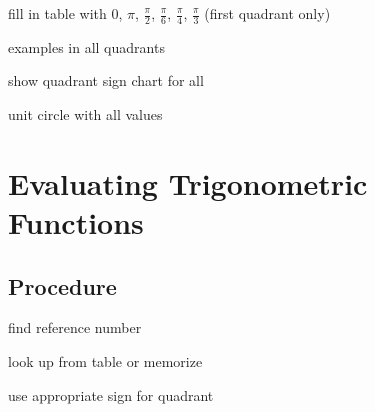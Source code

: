 \documentclass{exam}
\begin{document}
  \begin{itemize*}
    \item fill in table with 0, $\pi$, $\frac{\pi}{2}$, $\frac{\pi}{6}$, $\frac{\pi}{4}$, $\frac{\pi}{3}$ (first
      quadrant only)
    \item examples in all quadrants
    \item show quadrant sign chart for all
    \item unit circle with all values
  \end{itemize*}

  \section{Evaluating Trigonometric Functions}

  \subsection{Procedure}
  \begin{itemize*}
    \item find reference number
    \item look up from table or memorize
    \item use appropriate sign for quadrant
  \end{itemize*}
\end{document}
